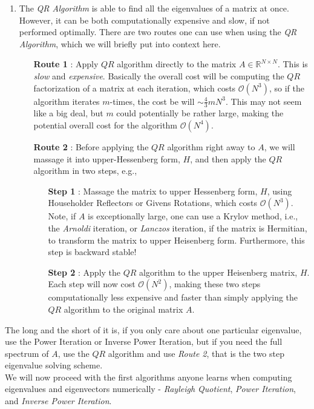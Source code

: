 \documentclass[paper=a4, fontsize=11pt]{scrartcl} %
\numberwithin{equation}{section} %
\numberwithin{figure}{section} %
\numberwithin{table}{section} %
\begin{document}
\begin{enumerate}
\item The \emph{QR Algorithm} is able to find all the eigenvalues of a matrix at once. However, it can be both computationally expensive and slow, if not performed optimally. There are two routes one can use when using the \emph{QR Algorithm}, which we will briefly put into context here. 
\begin{itemize}
\item[\textbf{Route 1}]: Apply $QR$ algorithm directly to the matrix $A\in\mathbb{R}^{N\times N}$. This is \emph{slow} and \emph{expensive}. Basically the overall cost will be computing the $QR$ factorization of a matrix at each iteration, which costs $\mathcal{O}(N^3)$, so if the algorithm iterates $m$-times, the cost be will $\sim \frac{4}{3}mN^3$. This may not seem like a big deal, but $m$ could potentially be rather large, making the potential overall cost for the algorithm $\mathcal{O}(N^4).$
\item[\textbf{Route 2}]: Before applying the $QR$ algorithm right away to $A$, we will massage it into upper-Hessenberg form, $H$, and then apply the $QR$ algorithm in two steps, e.g., 
\begin{itemize}
\item[\textbf{Step 1}]: Massage the matrix to upper Hessenberg form, $H$, using Householder Reflectors or Givens Rotations, which costs $\mathcal{O}(N^3)$. Note, if $A$ is exceptionally large, one can use a Krylov method, i.e., the \emph{Arnoldi} iteration, or \emph{Lanczos} iteration, if the matrix is Hermitian, to transform the matrix to upper Heisenberg form. Furthermore, this step is backward stable! 
\item[\textbf{Step 2}]: Apply the $QR$ algorithm to the upper Heisenberg matrix, $H$. Each step will now cost $\mathcal{O}(N^2)$, making these two steps computationally less expensive and faster than simply applying the $QR$ algorithm to the original matrix $A$. 
\end{itemize}
\end{itemize}

\end{enumerate}

The long and the short of it is, if you only care about one particular eigenvalue, use the Power Iteration or Inverse Power Iteration, but if you need the full spectrum of $A$, use the $QR$ algorithm and use \emph{Route 2}, that is the two step eigenvalue solving scheme. \\

We will now proceed with the first algorithms anyone learns when computing eigenvalues and eigenvectors numerically - \emph{Rayleigh Quotient}, \emph{Power Iteration}, and \emph{Inverse Power Iteration}.
\end{document}
